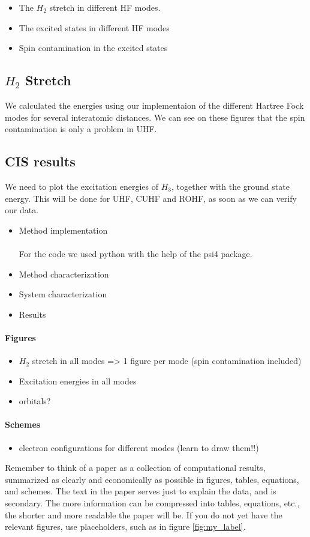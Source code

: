 \documentclass[twoside,twocolumn,9pt]{article}
\begin{document}
\begin{itemize}
    \item The $H_2$ stretch in different HF modes.
    \item The excited states in different HF modes
    \item Spin contamination in the excited states
\end{itemize}

\subsection{$H_2$ Stretch}
We calculated the energies using our implementaion of the different Hartree Fock modes for several interatomic distances. We can see on these figures that the spin contamination is only a problem in UHF.

\subsection{CIS results}
We need to plot the excitation energies of $H_3$, together with the ground state energy. This will be done for UHF, CUHF and ROHF, as soon as we can verify our data.
\begin{itemize}
    \item Method implementation
    \paragraph*{}
    For the code we used python with the help of the psi4 package.
    \item Method characterization
    \item System characterization
    \item Results
\end{itemize}
\paragraph*{Figures}
\begin{itemize}
    \item $H_2$ stretch in all modes => 1 figure per mode (spin contamination included)
    \item Excitation energies in all modes 
    \item orbitals?
\end{itemize}
\paragraph*{Schemes}
\begin{itemize}
  \item electron configurations for different modes (learn to draw them!!)
\end{itemize}
Remember to think of a paper as a collection of computational results, summarized as clearly and economically as possible in figures, tables, equations, and schemes. The text in the paper serves just to explain the data, and is secondary. The more information can be compressed into tables, equations, etc., the shorter and more readable the paper will be. If you do not yet have the relevant figures, use placeholders, such as in figure \ref{fig:my_label}.
\end{document}
